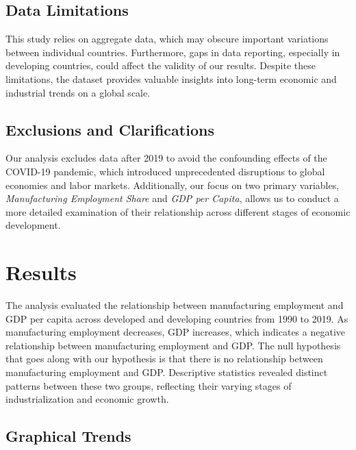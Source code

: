 \documentclass[12pt]{article}
\begin{document}
\subsection{Data Limitations}
This study relies on aggregate data, which may obscure important variations between individual countries. Furthermore, gaps in data reporting, especially in developing countries, could affect the validity of our results. Despite these limitations, the dataset provides valuable insights into long-term economic and industrial trends on a global scale.

\subsection{Exclusions and Clarifications}
Our analysis excludes data after 2019 to avoid the confounding effects of the COVID-19 pandemic, which introduced unprecedented disruptions to global economies and labor markets. Additionally, our focus on two primary variables, \textit{Manufacturing Employment Share} and \textit{GDP per Capita}, allows us to conduct a more detailed examination of their relationship across different stages of economic development.


\section{Results}
\label{sec:result}

The analysis evaluated the relationship between manufacturing employment and GDP per capita across developed and developing countries from 1990 to 2019. As manufacturing employment decreases, GDP increases, which indicates a negative relationship between manufacturing employment and GDP. The null hypothesis that goes along with our hypothesis is that there is no relationship between manufacturing employment and GDP. Descriptive statistics revealed distinct patterns between these two groups, reflecting their varying stages of industrialization and economic growth.

\subsection{Graphical Trends}
\end{document}

